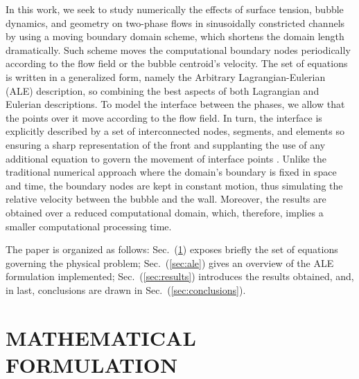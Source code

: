 \documentclass{wccm2014}
\begin{document}
In this work, we seek to study numerically the effects of surface
tension, bubble dynamics, and geometry on two-phase flows in
sinusoidally constricted channels by using a moving boundary domain
scheme, which shortens the domain length dramatically. Such scheme moves
the computational boundary nodes periodically according to the flow
field or the bubble centroid's velocity. The set of equations is written
in a generalized form, namely the Arbitrary Lagrangian-Eulerian (ALE)
description, so combining the best aspects of both Lagrangian and
Eulerian descriptions. To model the interface between the phases, we
allow that the points over it move according to the flow field. In turn,
the interface is explicitly described by a set of interconnected nodes,
segments, and elements so ensuring a sharp representation of the front
and supplanting the use of any additional equation to govern the movement
of interface points \cite{anjos2012,anjos2014}. Unlike the
traditional numerical approach where the domain's boundary is fixed in
space and time, the boundary nodes are kept in constant motion, thus
simulating the relative velocity between the bubble and the wall.
Moreover, the results are obtained over a reduced computational domain,
which, therefore, implies a smaller computational processing time.

The paper is organized as follows: Sec.~(\ref{sec:governing}) exposes
briefly the set of equations governing the physical problem;
Sec.~(\ref{sec:ale}) gives an overview of the ALE formulation
implemented; Sec.~(\ref{sec:results}) introduces the results obtained,
and, in last, conclusions are drawn in Sec.~(\ref{sec:conclusions}). 

\section{MATHEMATICAL FORMULATION}
\label{sec:governing}
\end{document}
